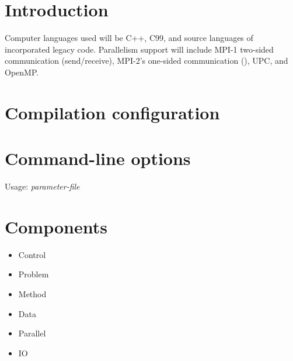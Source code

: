 \documentclass{book}
\begin{document}

\tableofcontents
\chapter{Introduction} \label{s:intro}

Computer languages used will be C++, C99, and source languages of
incorporated legacy code.  Parallelism support will include MPI-1
two-sided communication (send/receive), MPI-2's one-sided
communication (), UPC, and OpenMP.

\chapter{Compilation configuration} \label{s:compile}

\chapter{Command-line options} \label{s:commandline}

Usage:  \textit{parameter-file}

\chapter{Components} \label{s:components}

\begin{itemize}
\item Control
\item Problem
\item Method
\item Data
\item Parallel
\item IO
\end{itemize}
\end{document}
